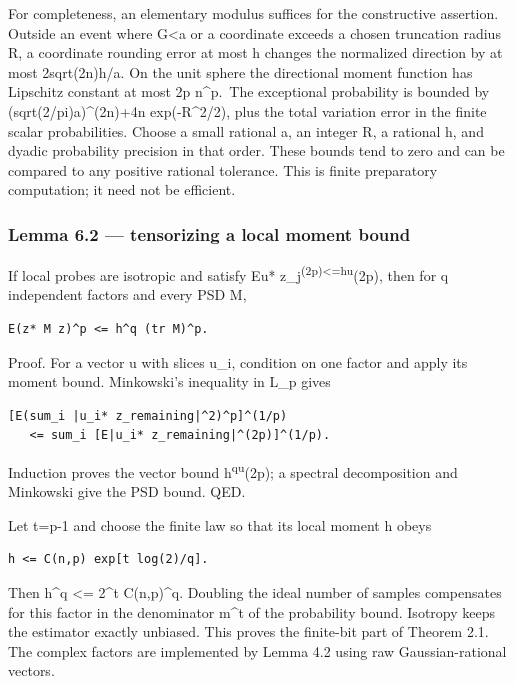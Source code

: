 \documentclass[
  10pt,
]{article}
\begin{document}
For completeness, an elementary modulus suffices for the constructive
assertion. Outside an event where
\textbar\textbar G\textbar\textbar\textless a or a coordinate exceeds a
chosen truncation radius R, a coordinate rounding error at most h
changes the normalized direction by at most 2sqrt(2n)h/a. On the unit
sphere the directional moment function has Lipschitz constant at most 2p
n\^{}p.~The exceptional probability is bounded by
(sqrt(2/pi)a)\^{}(2n)+4n exp(-R\^{}2/2), plus the total variation error
in the finite scalar probabilities. Choose a small rational a, an
integer R, a rational h, and dyadic probability precision in that order.
These bounds tend to zero and can be compared to any positive rational
tolerance. This is finite preparatory computation; it need not be
efficient.

\subsubsection{Lemma 6.2 --- tensorizing a local moment
bound}\label{lemma-6.2-tensorizing-a-local-moment-bound}

If local probes are isotropic and satisfy E\textbar u*
z\_j\textbar{}\textsuperscript{(2p)\textless=h\textbar\textbar u\textbar\textbar{}}(2p),
then for q independent factors and every PSD M,

\begin{verbatim}
E(z* M z)^p <= h^q (tr M)^p.
\end{verbatim}

Proof. For a vector u with slices u\_i, condition on one factor and
apply its moment bound. Minkowski's inequality in L\_p gives

\begin{verbatim}
[E(sum_i |u_i* z_remaining|^2)^p]^(1/p)
   <= sum_i [E|u_i* z_remaining|^(2p)]^(1/p).
\end{verbatim}

Induction proves the vector bound
h\textsuperscript{q\textbar\textbar u\textbar\textbar{}}(2p); a spectral
decomposition and Minkowski give the PSD bound. QED.

Let t=p-1 and choose the finite law so that its local moment h obeys

\begin{verbatim}
h <= C(n,p) exp[t log(2)/q].
\end{verbatim}

Then h\^{}q \textless= 2\^{}t C(n,p)\^{}q. Doubling the ideal number of
samples compensates for this factor in the denominator m\^{}t of the
probability bound. Isotropy keeps the estimator exactly unbiased. This
proves the finite-bit part of Theorem 2.1. The complex factors are
implemented by Lemma 4.2 using raw Gaussian-rational vectors.
\end{document}

